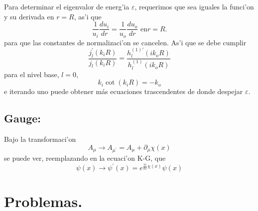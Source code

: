 Para determinar el eigenvalor de energ'ia $\varepsilon$, requerimos que
sea iguales la funci'on y su derivada en $r=R$, as'i que
\begin{equation}
\frac{1}{u_{i}}\frac{du_{i}}{dr}=\frac{1}{u_{o}}\frac{du_{o}}{dr}\text{ en
}r=R\text{.}%
\end{equation}
para que las constantes de normalizaci'on se cancelen. As'i que se debe
cumplir
\begin{equation}
\frac{j_{l}^{\prime}\left(  k_{i}R\right)  }{j_{l}\left(  k_{i}R\right)
}=\frac{h_{l}^{\left(  1\right)  \prime}\left(  ik_{o}R\right)  }%
{h_{l}^{\left(  1\right)  }\left(  ik_{o}R\right)  }%
\end{equation}
para el nivel base, $l=0$,
\begin{equation}
k_{i}\cot\left(  k_{i}R\right)  =-k_{o}%
\end{equation}
e iterando uno puede obtener m\'{a}s ecuaciones trascendentes de donde
despejar $\varepsilon$.

\subsection{Gauge:}

Bajo la transformaci'on
\begin{equation}
A_{\mu}\rightarrow A_{\mu^{\prime}}=A_{\mu}+\partial_{\mu}\chi\left(
x\right)
\end{equation}
se puede ver, reemplazando en la ecuaci'on K-G, que
\begin{equation}
\psi\left(  x\right)  \rightarrow\psi^{\prime}\left(  x\right)  =e^{\frac
{ie}{\hbar c}\chi\left(  x\right)  }\psi\left(  x\right)
\end{equation}

\section{Problemas.}

